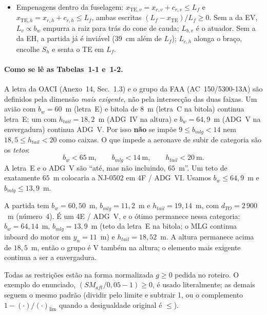 \begin{itemize}
      piso o coloca na metade traseira (longarina traseira). Com $y_{mlg}$
      livre, o SLSQP alarga a bitola até $13{,}9$~m: o bordo de fuga na
      nova estação recua, $x_{r,w}$ pode avançar e o MLG continua
      em $\xi=1$. Sem $y_{mlg}$ esse ganho exigia $\xi=1{,}25$ (variante~V5).
\item Empenagens dentro da fuselagem:
      $x_{\mathrm{TE},v}=x_{r,v}+c_{r,v}\le L_f$ e
      $x_{\mathrm{TE},h}=x_{r,h}+c_{r,h}\le L_f$, ambas escritas
      $(L_f-x_{\mathrm{TE}})/L_f\ge 0$. Sem a da EV, $L_v\propto b_w$
      empurra a raiz para trás do cone de cauda; $L_{b,v}$ é o atuador.
      Sem a da EH, a partida já é inviável ($39$~cm além de $L_f$);
      $L_{c,h}$ alonga o braço, encolhe $S_h$ e senta o TE em $L_f$.
\end{itemize}

\paragraph{Como se lê as Tabelas~1-1 e~1-2.}
A letra da OACI (Anexo~14, Sec.~1.3) e o grupo da FAA (AC~150/5300-13A)
são definidos pela dimensão \emph{mais exigente}, não pela
intersecção das duas faixas. Um avião com $b_w=60$~m (letra~E) e
bitola de $8$~m (letra~C na bitola) continua letra~E; um com
$h_{tail}=18{,}2$~m (ADG~IV na altura) e $b_w=64{,}9$~m (ADG~V na
envergadura) continua ADG~V. Por isso \textbf{não} se impõe
$9\le b_{mlg}<14$ nem $18{,}5\le h_{tail}<20$ como caixas. O que impede a
aeronave de subir de categoria são os \emph{tetos}:
\begin{equation}
b_w < 65~\mathrm{m},\qquad
b_{mlg} < 14~\mathrm{m},\qquad
h_{tail} < 20~\mathrm{m}.
\end{equation}
A letra~E e o ADG~V são ``até, mas não incluindo, $65$~m''. Um teto
de exatamente $65$~m colocaria a NJ-0502 em 4F / ADG~VI. Usamos
$b_w\le 64{,}9$~m e $b_{mlg}\le 13{,}9$~m.

A partida tem $b_w=60{,}50$~m, $b_{mlg}=11{,}2$~m e $h_{tail}=19{,}14$~m,
com $d_{TO}=2\,900$~m (número~4). É um 4E / ADG~V, e o ótimo
permanece nessa categoria: $b_w=64{,}14$~m, $b_{mlg}=13{,}9$~m (teto da
letra~E na bitola; o MLG continua inboard do motor em $y_n=11$~m) e
$h_{tail}=18{,}52$~m.
A altura permanece acima de $18{,}5$~m, então o grupo é V também na
altura; o elemento mais exigente continua a ser a envergadura.

Todas as restrições estão na forma normalizada $g\ge 0$ pedida no
roteiro. O exemplo do enunciado, $(SM_{aft}/0{,}05-1)\ge 0$, é usado
literalmente; as demais seguem o mesmo padrão (dividir pelo limite e
subtrair 1, ou o complemento $1-(\cdot)/(\cdot)_{\lim}$ quando a
desigualdade original é $\le$).

